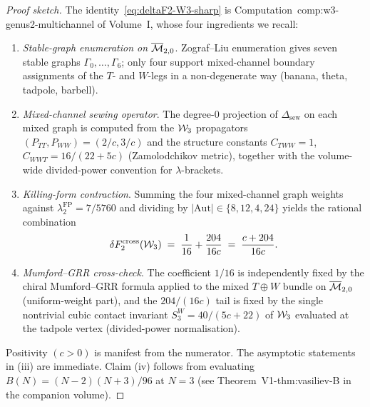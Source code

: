 \begin{proof}[Proof sketch]
The identity~\eqref{eq:deltaF2-W3-sharp} is
Computation~\textup{comp:w3-genus2-multichannel} of
Volume~I, whose four ingredients we recall:
\begin{enumerate}[label=\textup{(\arabic*)}]
\item \emph{Stable-graph enumeration on $\overline{\mathcal{M}}_{2,0}$}.
Zograf--Liu enumeration gives seven stable graphs
$\Gamma_0,\dots,\Gamma_6$; only four support
mixed-channel boundary assignments of the $T$- and
$W$-legs in a non-degenerate way (banana, theta,
tadpole, barbell).
\item \emph{Mixed-channel sewing operator}. The
degree-$0$ projection of $\Delta_{\mathrm{sew}}$ on
each mixed graph is computed from the $\mathcal{W}_3$
propagators $(P_{TT}, P_{WW}) = (2/c,3/c)$ and the
structure constants
$C_{TWW} = 1$, $C_{WWT} = 16/(22+5c)$ (Zamolodchikov
metric), together with the volume-wide divided-power
convention for $\lambda$-brackets.
\item \emph{Killing-form contraction}. Summing the four
mixed-channel graph weights against
$\lambda_2^{\mathrm{FP}} = 7/5760$ and dividing by
$|\mathrm{Aut}|\in\{8,12,4,24\}$ yields the rational
combination
\[
\delta F_2^{\mathrm{cross}}(\mathcal{W}_3) \;=\;
\frac{1}{16} + \frac{204}{16c}
\;=\; \frac{c+204}{16c}.
\]
\item \emph{Mumford--GRR cross-check}. The coefficient
$1/16$ is independently fixed by the chiral
Mumford--GRR formula applied to the mixed $T\oplus W$
bundle on $\overline{\mathcal{M}}_{2,0}$ (uniform-weight part),
and the $204/(16c)$ tail is fixed by the single
nontrivial cubic contact invariant
$S_3^W = 40/(5c{+}22)$ of $\mathcal{W}_3$ evaluated at the
tadpole vertex (divided-power normalisation).
\end{enumerate}
Positivity $(c>0)$ is manifest from the numerator.
The asymptotic statements in (iii) are immediate. Claim
(iv) follows from evaluating $B(N)=(N-2)(N+3)/96$ at
$N=3$ (see Theorem~\textup{V1-thm:vasiliev-B} in the
companion volume).
\end{proof}

